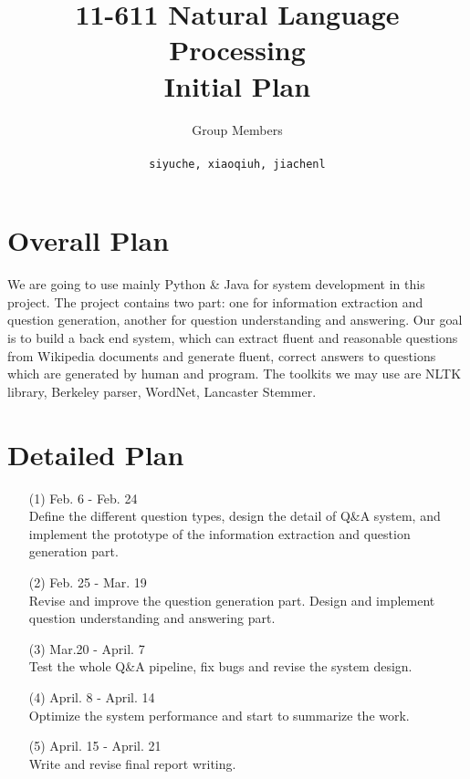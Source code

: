 \documentclass[a4page]{article}
\author{Group Members \\ \text{Siyu Chen, Xiaoqiu Huang, Jiachen Li} \\ \texttt{siyuche, xiaoqiuh, jiachenl}
}
\title{11-611 Natural Language Processing \\ Initial Plan}
\date{}
\begin{document}
\maketitle


\section{Overall Plan}
We are going to use mainly Python \& Java for system development in this project. The project contains two part: one for information extraction and question generation, another for question understanding and answering.
Our goal is to build a back end system, which can extract fluent and reasonable questions from Wikipedia documents and generate fluent, correct answers to questions which are generated by human and program.
The toolkits we may use are NLTK library, Berkeley parser, WordNet, Lancaster Stemmer.

\section{Detailed Plan}

\begin{itemize}
\item[(1)]Feb. 6 - Feb. 24 \\ Define the different question types, design the detail of Q\&A system, and implement the prototype of the information extraction and question generation part.
\item[(2)]Feb. 25 - Mar. 19 \\ Revise and improve the question generation part. Design and implement question understanding and answering part.
\item[(3)]Mar.20 - April. 7 \\ Test the whole Q\&A pipeline, fix bugs and revise the system design.
\item[(4)]April. 8 - April. 14 \\ Optimize the system performance and start to summarize the work.
\item[(5)]April. 15 - April. 21 \\ Write and revise final report writing.

\end{itemize}
\end{document}
